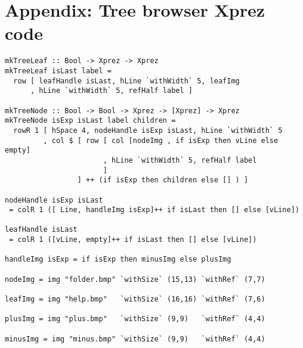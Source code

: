 \section*{Appendix: Tree browser {\sc Xprez} code}
\label{treebrowser}
\begin{small}\begin{verbatim}
mkTreeLeaf :: Bool -> Xprez -> Xprez
mkTreeLeaf isLast label = 
  row [ leafHandle isLast, hLine `withWidth` 5, leafImg
      , hLine `withWidth` 5, refHalf label ] 

mkTreeNode :: Bool -> Bool -> Xprez -> [Xprez] -> Xprez
mkTreeNode isExp isLast label children =
  rowR 1 [ hSpace 4, nodeHandle isExp isLast, hLine `withWidth` 5
         , col $ [ row [ col [nodeImg , if isExp then vLine else empty]
                       , hLine `withWidth` 5, refHalf label 
                       ] 
                 ] ++ (if isExp then children else [] ) ]

nodeHandle isExp isLast 
 = colR 1 ([ Line, handleImg isExp]++ if isLast then [] else [vLine])

leafHandle isLast 
 = colR 1 ([vLine, empty]++ if isLast then [] else [vLine])

handleImg isExp = if isExp then minusImg else plusImg

nodeImg = img "folder.bmp" `withSize` (15,13) `withRef` (7,7)

leafImg = img "help.bmp"   `withSize` (16,16) `withRef` (7,6)

plusImg = img "plus.bmp"   `withSize` (9,9)   `withRef` (4,4)

minusImg = img "minus.bmp" `withSize` (9,9)   `withRef` (4,4)
\end{verbatim}\end{small}

